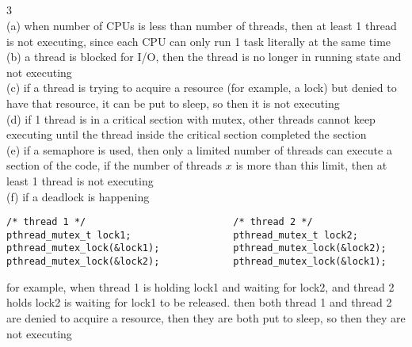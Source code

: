 \documentclass[12pt, border = 4pt, multi]{article} %
\begin{document}
\\
\\
\\
\\
3\\
(a) when number of CPUs is less than number of threads, then at least 1 thread is not executing, since each CPU can only run 1 task literally at the same time\\
(b) a thread is blocked for I/O, then the thread is no longer in running state and not executing\\
(c) if a thread is trying to acquire a resource (for example, a lock) but denied to have that resource, it can be put to sleep, so then it is not executing\\
(d) if 1 thread is in a critical section with mutex, other threads cannot keep executing until the thread inside the critical section completed the section\\
(e) if a semaphore is used, then only a limited number of threads can execute a section of the code, if the number of threads $x$ is more than this limit, then at least 1 thread is not executing\\
(f) if a deadlock is happening
\begin{lstlisting}
/* thread 1 */                          /* thread 2 */
pthread_mutex_t lock1;                  pthread_mutex_t lock2;
pthread_mutex_lock(&lock1);             pthread_mutex_lock(&lock2);
pthread_mutex_lock(&lock2);             pthread_mutex_lock(&lock1);
\end{lstlisting}
for example, when thread 1 is holding lock1 and waiting for lock2, and thread 2 holds lock2 is waiting for lock1 to be released. then both thread 1 and thread 2 are denied to acquire a resource, then they are both put to sleep, so then they are not executing
\end{document}
